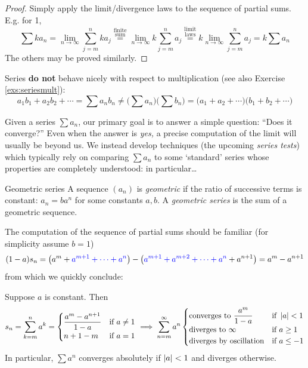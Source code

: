 \begin{proof}
	Simply apply the limit/divergence laws to the sequence of partial sums. E.g.{} for 1,
	\[
	  \sum ka_n = \lim_{n\to\infty}\sum_{j=m}^nka_j \overset{\text{finite}}{\overset{\text{sum}}{=}} 
	  \lim_{n\to\infty}k\sum_{j=m}^na_j \overset{\text{limit}}{\overset{\text{laws}}{=}}
	  k\lim_{n\to\infty}\sum_{j=m}^na_j =k\sum a_n
	\]
	The others may be proved similarly.
\end{proof}


Series \textbf{do not} behave nicely with respect to multiplication (see also Exercise \ref{exs:seriesmult}):
\[
	a_1b_1+a_2b_2+\cdots 
	=\sum a_nb_n\neq \bigl(\sum a_n\bigr)\bigl(\sum b_n\bigr) 
	=\bigl(a_1+a_2+\cdots\bigr)\bigl(b_1+b_2+\cdots\bigr)
\]

\goodbreak



Given a series $\sum a_n$, our primary goal is to answer a simple question: ``Does it converge?'' Even when the answer is \emph{yes,} a precise computation of the limit will usually be beyond us. We instead develop techniques (the upcoming \emph{series tests}) which typically rely on comparing $\sum a_n$ to some `standard' series whose properties are completely understood: in particular\ldots

\begin{defn}{Geometric series}{}
	A sequence $(a_n)$ is \emph{geometric} if the ratio of successive terms is constant: $a_n=ba^n$ for some constants $a,b$. A \emph{geometric series} is the sum of a geometric sequence. 
\end{defn}

The computation of the sequence of partial sums should be familiar (for simplicity assume $b=1$)
\[
	(1-a)s_n
	=\bigl(a^m+\textcolor{blue}{a^{m+1}+\cdots+a^n}\bigr)
	-\bigl(\textcolor{blue}{a^{m+1}+a^{m+2}+\cdots +a^n}+a^{n+1}\bigr) 
	=a^m-a^{n+1}
\]
from which we quickly conclude:

\begin{thm}{}{}
	Suppose $a$ is constant. Then
	\[
		s_n=\sum_{k=m}^n a^k=
		\begin{cases}
			\dfrac{a^m-a^{n+1}}{1-a}&\text{if }a\neq 1\\
			n+1-m&\text{if }a=1
		\end{cases}
		\implies \sum_{n=m}^\infty a^n
		\begin{cases}
			\text{converges to }\dfrac{a^m}{1-a}&\text{if }\left| a\right|<1\\
			\text{diverges to $\infty$}&\text{if }a\ge 1\\
			\text{diverges by oscillation}&\text{if }a\le -1
		\end{cases}
	\]
	In particular, $\sum a^n$ converges absolutely if $\left| a\right|<1$ and diverges otherwise. 
\end{thm}


